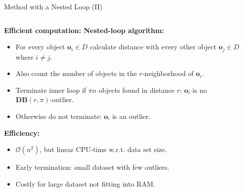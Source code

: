 \begin{frame}{Method with a Nested Loop (II)}
	\begin{columns}[t]
		\begin{column}{0.5\textwidth}
			\vspace*{-0.5em}
			\textbf{Efficient computation: {\color{airforceblue}Nested-loop algorithm}:}
			\begin{itemize}
				\item For every object $\mathbf{o}_i\in D$ calculate distance with every other object $\mathbf{o}_j \in D$ where $i\neq j$.
				\item Also count the number of objects in the $r$-neighborhood of $\mathbf{o}_i$.
				\item Terminate inner loop if $\pi n$ objects found in distance $r$: $\mathbf{o}_i$ is no $\mathbf{DB}(r, \pi)$-outlier.
				\item Otherwise do not terminate: $\mathbf{o}_i$ is an outlier.
			\end{itemize}
			\textbf{Efficiency:}
			\begin{itemize}
				\item $\mathcal{O}(n^2)$, but linear CPU-time w.r.t. data set size.
				\item Early termination: small dataset with few outliers.
				\item Costly for large dataset not fitting into RAM.
			\end{itemize}
		\end{column}

		\begin{column}{0.5\textwidth}
			\vspace*{1em}
			\scriptsize
			\begin{algorithm}[H]
				\SetAlgoVlined
				\BlankLine
				\BlankLine
			\end{algorithm}
		\end{column}
	\end{columns}
\end{frame}


